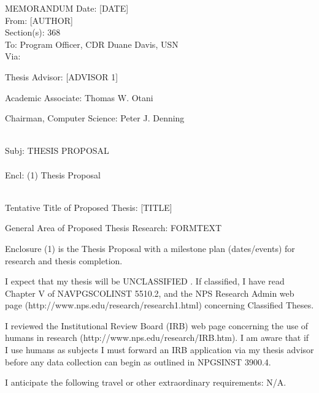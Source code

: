 \documentclass{article}
\begin{document}
\noindent MEMORANDUM \hfill Date: [DATE]\\

\noindent 
From: [AUTHOR]\\
Section(s): 368\\

\noindent
To: Program Officer, CDR Duane Davis, USN\\

\noindent
Via: 
\begin{compactenum}
\item Thesis Advisor:  [ADVISOR 1]
\item Academic Associate: Thomas W. Otani
\item Chairman, Computer Science: Peter J. Denning
\end{compactenum}

\noindent 
\\
Subj: THESIS PROPOSAL\\
\\
Encl: (1) Thesis Proposal\\
\\

\begin{compactenum}
\item Tentative Title of Proposed Thesis: [TITLE]
\item General Area of Proposed Thesis Research:  FORMTEXT      
\item Enclosure (1) is the Thesis Proposal with a milestone plan
  (dates/events) for research and thesis completion.
\item I expect that my thesis will be UNCLASSIFIED .  If classified, I
  have read Chapter V of NAVPGSCOLINST 5510.2, and the NPS Research
  Admin web page (http://www.nps.edu/research/research1.html)
  concerning Classified Theses.
\item I reviewed the Institutional Review Board (IRB) web page
  concerning the use of humans in research
  (http://www.nps.edu/research/IRB.htm).  I am aware that if I use
  humans as subjects I must forward an IRB application via my thesis
  advisor before any data collection can begin as outlined in NPGSINST
  3900.4.
\item I anticipate the following travel or other extraordinary
  requirements: N/A.
\end{compactenum}
\end{document}

